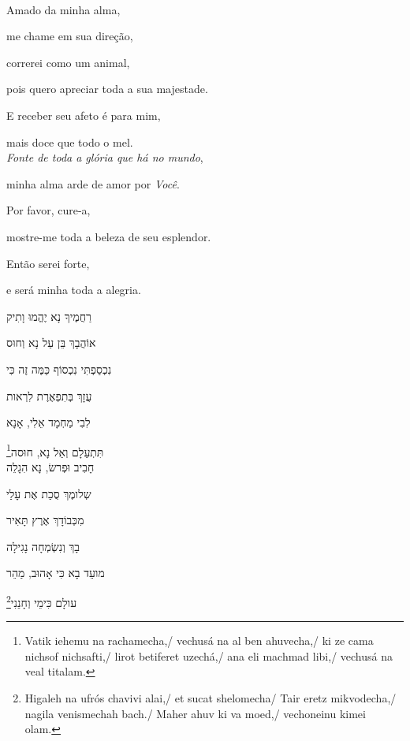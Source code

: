 \movetooddpage
\raggedright

\vspace*{1cm}

\textbf{}\\[15pt]

Amado da minha alma,

me chame em sua direção,

correrei como um animal,

pois quero apreciar toda a sua majestade.

E receber seu afeto é para mim,

mais doce que todo o mel.\\[10pt]

\emph{Fonte de toda a glória que há no mundo},

minha alma arde de amor por \emph{Você}.

Por favor, cure-a,

mostre-me toda a beleza de seu esplendor.

Então serei forte,

e será minha toda a alegria.\\[10pt]

\movetoevenpage
\raggedleft

\vspace*{1cm}

רַחֲמֶיךָ נָא יֶהֱמוּ וָתִיק 

אוֹהֲבָךְ בֵּן עַל נָא וְחוּס 

נִכְסַפְתִּי נִכְסוֹף כַּמֶּה זֶה כִּי 

עֻזָךְ בְּתִפְאֶרֶת לִרְאות 

לִבִי מַחְמָד אֵלִי, אָנָא 

תִּתְעַלָם וְאַל נָא, חוּסה\footnote{Vatik iehemu na rachamecha,/
vechusá na al ben ahuvecha,/ ki ze cama nichsof nichsafti,/ lirot betiferet uzechá,/
ana eli machmad libi,/ vechusá na veal titalam.}\\[10pt]

חָבִיב וּפְרשׂ, נָא הִגָלֵה

שְלומֶךְ סֻכַת אֶת עָלַי 

מִכְּבוֹדָךְ אֶרֶץ תָּאִיר 

בָךְ וְנִשְׂמְחָה נָגִילָה 

מועֵד בָא כִּי אָהוּב, מַהֵר

עולָם כִּימֵי וְחָנֵנִי\footnote{
Higaleh na ufrós chavivi alai,/
et sucat shelomecha/ Tair eretz mikvodecha,/ nagila venismechah bach./ Maher ahuv ki va moed,/
vechoneinu kimei olam.}

